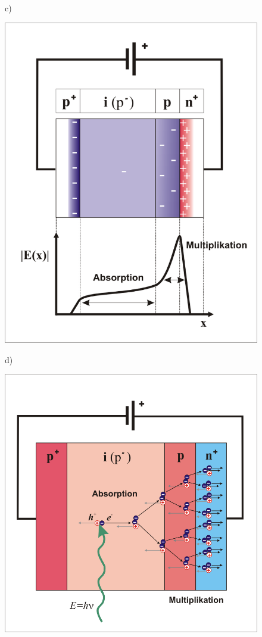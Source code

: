 \begin{figure}[tbh]
\begin{minipage}{.45\textwidth}
	\end{minipage}
	c)
	\begin{minipage}{.45\textwidth}
		\includegraphics[width=\linewidth]{./ImageFiles/APD2_German.png}
	\end{minipage}
	d)
	\begin{minipage}{.45\textwidth}
		\includegraphics[width=\linewidth]{./ImageFiles/APD3_German.png}

\end{minipage}
\end{figure}
